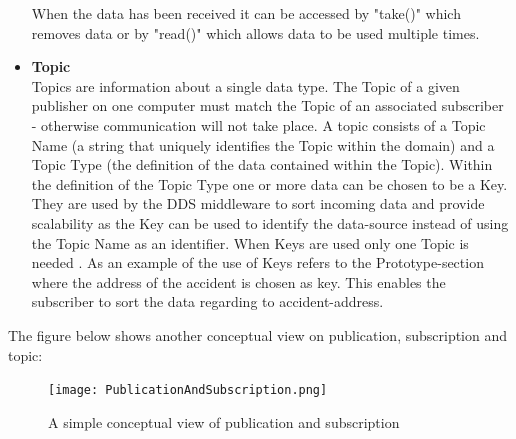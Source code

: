 \documentclass[Main]{subfiles}
\begin{document}
\begin{itemize}
\begin{itemize}
  \end{itemize}
  When the data has been received it can be accessed by "take()" which removes data or by "read()" which allows data to be used multiple times.
  \item \textbf{Topic}\\Topics are information about a single data type. The Topic of a given publisher on one computer must match the Topic of an associated subscriber - otherwise communication will not take place. A topic consists of a Topic Name (a string that uniquely identifies the Topic within the domain) and a Topic Type (the definition of the data contained within the Topic). Within the definition of the Topic Type one or more data can be chosen to be a Key. They are used by the DDS middleware to sort incoming data and provide scalability as the Key can be used to identify the data-source instead of using the Topic Name as an identifier. When Keys are used only one Topic is needed \cite{RTI} \cite{opendds} \cite{DDS-slides}. As an example of the use of Keys refers to the Prototype-section where the address of the accident is chosen as key. This enables the subscriber to sort the data regarding to accident-address.
\end{itemize}

The figure below shows another conceptual view on publication, subscription and topic: 

\begin{figure}[H]
\centering
\texttt{[image: PublicationAndSubscription.png]}
\caption{A simple conceptual view of publication and subscription \cite{ddsopen}}
\end{figure}
\end{document}
